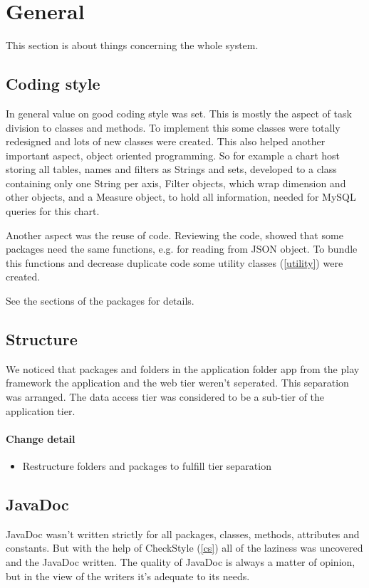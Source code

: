 \section{General}
This section is about things concerning the whole system.

\subsection{Coding style}
In general value on good coding style was set. This is mostly the aspect
of task division to classes and methods. To implement this some classes were totally redesigned
and lots of new classes were created. This also helped another important aspect, object oriented programming.
So for example a chart host storing all tables, names and filters as Strings and sets, developed to
a class containing only one String per axis, Filter objects, which wrap dimension and other objects, and a Measure
object, to hold all information, needed for MySQL queries for this chart.

Another aspect was the reuse of code. Reviewing the code, showed that some packages need the same
functions, e.g. for reading from JSON object. To bundle this functions and
decrease duplicate code some utility classes (\ref{utility}) were created.

See the sections of the packages for details.

\subsection{Structure}
We noticed that packages and folders in the application folder app from the play framework 
the application and the web tier weren't seperated. This separation was arranged. 
The data access tier was considered to be a sub-tier of the application tier. 

\paragraph{Change detail}
\begin{itemize}
  \item Restructure folders and packages to fulfill tier separation
\end{itemize}

\subsection{JavaDoc} %
JavaDoc wasn't written strictly for all packages, classes, methods, attributes and constants. 
But with the help of CheckStyle (\ref{cs}) all of the laziness was uncovered and the JavaDoc written.
The quality of JavaDoc is always a matter of opinion, but in the view of the
writers it's adequate to its needs.

